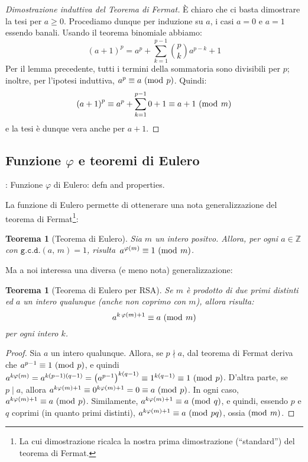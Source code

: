 \documentclass[pdflatex,11pt,a4paper,oneside]{article}
\newcommand{\XXX}[1][XXX]{\text{\bfseries{\color{red}{\emph{#1}}}}}
\newcommand{\TODO}[0]{\XXX[TODO]}
\newcommand{\p}[1]{\left({#1}\right)}
\renewcommand{\phi}{\varphi}
\newcommand{\ephi}[1]{\ensuremath{\phi\p{#1}}}
\newcommand{\Z}[0]{\mathbb{Z}}
\newcommand{\divides}[0]{\mid}
\newcommand{\notdivides}[0]{\nmid}
\newcommand{\congruent}[0]{\equiv}
\newcommand{\mmodop}[0]{\ensuremath{\operatorname{mod}}}
\newcommand{\mmod}[1]{\ensuremath{\allowbreak\ (\mmodop\:{#1})}}
\newcommand{\gcdop}[0]{\ensuremath{\mathtt{g.c.d.}}}
\newcommand{\xgcd}[1]{\ensuremath{\gcdop\left({#1}\right)}}
\renewcommand{\gcd}[2]{\xgcd{{#1},\,{#2}}}
\newtheorem{theorem}[TheoremLike]{Teorema}
\begin{document}
\begin{proof}[Dimostrazione induttiva del Teorema di Fermat]
\`E chiaro che ci basta dimostrare la tesi per $a \geq 0$.  Procediamo
dunque per induzione su $a$, i casi $a = 0$ e $a = 1$ essendo banali.
Usando il teorema binomiale abbiamo:
\begin{displaymath}
  \p{a+1}^p = a^p + \sum_{k=1}^{p-1} \binom{p}{k}a^{p-k} + 1
\end{displaymath}
Per il lemma precedente, tutti i termini della sommatoria sono divisibili
per $p$; inoltre, per l'ipotesi induttiva, $a^p \congruent a \mmod p$.
Quindi:
\begin{displaymath}
  \p{a+1}^p \congruent a^p + \sum_{k=1}^{p-1} 0 + 1
            \congruent a + 1 \mmod m
\end{displaymath}
e la tesi \`e dunque vera anche per $a + 1$.
\end{proof}


\subsection{Funzione $\phi$ e teoremi di Eulero}

\TODO: Funzione $\phi$ di Eulero: defn and properties.

La funzione di Eulero permette di ottenerare una nota generalizzazione
del teorema di Fermat\footnote{La cui dimostrazione ricalca la nostra
prima dimostrazione (``standard'') del teorema di Fermat.}:

\begin{theorem}[Teorema di Eulero]\label{thm:euler}
  Sia $m$ un intero positvo. Allora, per ogni $a \in \Z$ con
  $\gcd{a}{m} = 1$, risulta\, $a^{\ephi{m}} \congruent 1 \mmod m$.
\end{theorem}

\noindent
Ma a noi interessa una diversa (e meno nota) generalizzazione:

\begin{theorem}[Teorema di Eulero per RSA]\label{thm:euler-rsa}
Se $m$ \`e prodotto di due primi \emph{distinti} ed $a$ un intero
qualunque (anche non coprimo con $m$), allora risulta:
  $$ a^{k\,\ephi{m} + 1} \congruent a \mmod m $$
per ogni intero $k$.
\end{theorem}
%
\begin{proof}
Sia $a$ un intero qualunque.  Allora, se $p \notdivides a$, dal teorema
di Fermat deriva che $a^{p-1} \congruent 1 \mmod p$, e quindi
$a^{k\ephi{m}} = a^{k(p-1)(q-1)} = {\p{a^{p-1}}}^{k(q-1)} \congruent
1^{k(q-1)} \congruent 1 \mmod p$.  D'altra parte, se $p \divides a$,
allora $a^{k\ephi{m} + 1} \congruent 0^{k\ephi{m} + 1} = 0 \congruent a
\mmod p$. In ogni caso, $a^{k\ephi{m} + 1} \congruent a \mmod p$.
Similamente, $a^{k\ephi{m} + 1} \congruent a \mmod q$, e quindi, essendo
$p$ e $q$ coprimi (in quanto primi distinti), $a^{k\ephi{m} + 1}
\congruent a \mmod{pq}$,
ossia$\mmod m$. %
\end{proof}
\end{document}
